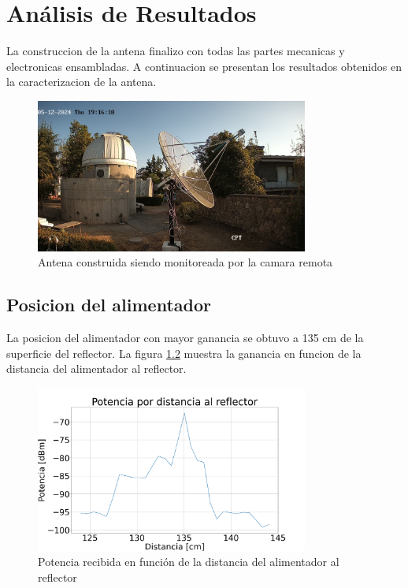 \chapter{Análisis de Resultados}

La construccion de la antena finalizo con todas las partes mecanicas y electronicas ensambladas. A continuacion se presentan los resultados obtenidos en la caracterizacion de la antena.\\

\begin{figure}
    \centering
    \includegraphics[width=0.8\textwidth]{img/antenna}
    \caption{Antena construida siendo monitoreada por la camara remota}
    \label{fig:antena}
\end{figure}

\section{Posicion del alimentador}

La posicion del alimentador con mayor ganancia se obtuvo a 135 cm de la superficie del reflector. La figura \ref{fig:distancia} muestra la ganancia en funcion de la distancia del alimentador al reflector.\\

\begin{figure}
    \centering
    \includegraphics[width=0.8\textwidth]{img/enfoqueDist}
    \caption{Potencia recibida en función de la distancia del alimentador al reflector}
    \label{fig:distancia}
\end{figure}

